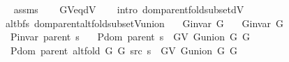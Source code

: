 \begin{isabellebody}
\endisataginvisible
{\isafoldinvisible}%
%
\isadeliminvisible
\isanewline
%
\endisadeliminvisible
%
\isadelimproof
\ \ %
\endisadelimproof
%
\isatagproof
{}\isamarkupfalse%
\ assms\isanewline
\ \ \isamarkupfalse%
\ G{\isachardot}{\kern0pt}V{\isacharunderscore}{\kern0pt}eq{\isacharunderscore}{\kern0pt}dV\isanewline
\ \ \isamarkupfalse%
\ {\isacharparenleft}{\kern0pt}intro\ dom{\isacharunderscore}{\kern0pt}parent{\isacharunderscore}{\kern0pt}fold{\isacharunderscore}{\kern0pt}subset{\isacharunderscore}{\kern0pt}dV{\isacharparenright}{\kern0pt}%
\endisatagproof
{\isafoldproof}%
%
\isadelimproof
\isanewline
%
\endisadelimproof
%
\isadeliminvisible
\isanewline
%
\endisadeliminvisible
%
\isataginvisible
{}\isamarkupfalse%
\ {\isacharparenleft}{\kern0pt}\ alt{\isacharunderscore}{\kern0pt}bfs{\isacharparenright}{\kern0pt}\ dom{\isacharunderscore}{\kern0pt}parent{\isacharunderscore}{\kern0pt}alt{\isacharunderscore}{\kern0pt}fold{\isacharunderscore}{\kern0pt}subset{\isacharunderscore}{\kern0pt}V{\isacharunderscore}{\kern0pt}union{\isacharcolon}{\kern0pt}\isanewline
\ \ \ {\isachardoublequoteopen}G{\isachardot}{\kern0pt}invar\ G{}{\isachardoublequoteclose}\isanewline
\ \ \ {\isachardoublequoteopen}G{\isachardot}{\kern0pt}invar\ G{}{\isachardoublequoteclose}\isanewline
\ \ \ {\isachardoublequoteopen}P{\isacharunderscore}{\kern0pt}invar\ {\isacharparenleft}{\kern0pt}parent\ s{\isacharparenright}{\kern0pt}{\isachardoublequoteclose}\isanewline
\ \ \ {\isachardoublequoteopen}P{\isachardot}{\kern0pt}dom\ {\isacharparenleft}{\kern0pt}parent\ s{\isacharparenright}{\kern0pt}\ {\isasymsubseteq}\ G{\isachardot}{\kern0pt}V\ {\isacharparenleft}{\kern0pt}G{\isachardot}{\kern0pt}union\ G{}\ G{}{\isacharparenright}{\kern0pt}{\isachardoublequoteclose}\isanewline
\ \ \ {\isachardoublequoteopen}P{\isachardot}{\kern0pt}dom\ {\isacharparenleft}{\kern0pt}parent\ {\isacharparenleft}{\kern0pt}alt{\isacharunderscore}{\kern0pt}fold\ G{}\ G{}\ src\ s{\isacharparenright}{\kern0pt}{\isacharparenright}{\kern0pt}\ {\isasymsubseteq}\ G{\isachardot}{\kern0pt}V\ {\isacharparenleft}{\kern0pt}G{\isachardot}{\kern0pt}union\ G{}\ G{}{\isacharparenright}{\kern0pt}{\isachardoublequoteclose}%
\endisataginvisible
{\isafoldinvisible}%
%
\isadeliminvisible
\isanewline
%
\endisadeliminvisible
%
\isadelimproof
\ \ %
\endisadelimproof
%
\isatagproof

\end{isabellebody}
